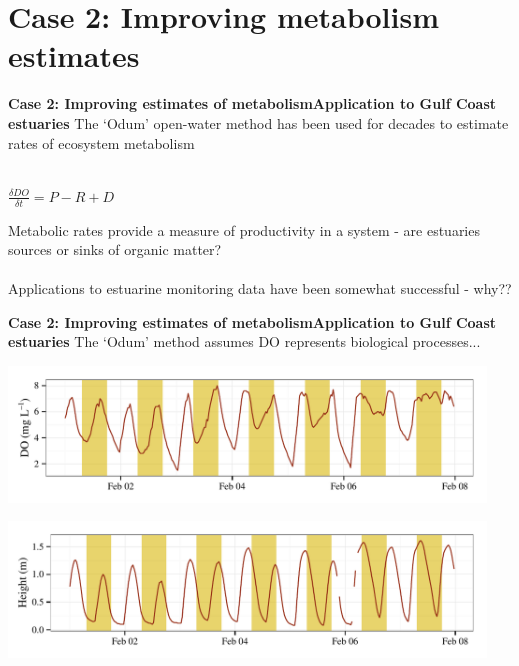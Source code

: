 \documentclass[serif]{beamer}\usepackage[]{graphicx}\usepackage[]{color}
\begin{document}
\section{Case 2: Improving metabolism estimates}

\begin{frame}{\textbf{Case 2: Improving estimates of metabolism}}{\textbf{Application to Gulf Coast estuaries}}
The `Odum' open-water method has been used for decades to estimate rates of ecosystem metabolism \scriptsize \cite{Odum56} \\~\\
\normalsize
\begin{center}
$\frac{\delta DO}{\delta t} = P - R + D$
\end{center}
Metabolic rates provide a measure of productivity in a system - are estuaries sources or sinks of organic matter? \scriptsize \cite{Caffrey14}
\normalsize \\~\\
Applications to estuarine monitoring data have been somewhat successful - why?? 
\end{frame}

\begin{frame}{\textbf{Case 2: Improving estimates of metabolism}}{\textbf{Application to Gulf Coast estuaries}}
The `Odum' method assumes DO represents biological processes...


{\centering \includegraphics[width=0.95\textwidth]{fig/sapdo} 

}





{\centering \includegraphics[width=0.95\textwidth]{fig/saptide} 

}



\end{frame}
\end{document}
